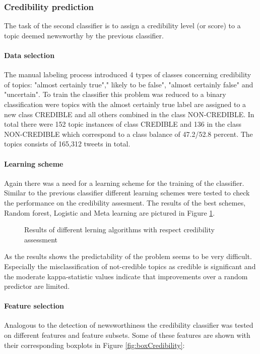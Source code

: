 \documentclass{proseminar}
\begin{document}
\subsubsection*{Credibility prediction}
The task of the second classifier is to assign a credibility level (or score) to a topic deemed newsworthy by the previous classifier.

\paragraph{Data selection}
The manual labeling process introduced 4 types of classes concerning credibility of topics:  "almost certainly true"," likely to be false",  "almost certainly false" and "uncertain". To train the classifier this problem was reduced to a binary classification were topics with the almost certainly true label are assigned to a new class CREDIBLE and all others combined in the class NON-CREDIBLE.
In total there were 152 topic instances of class CREDIBLE and 136 in the class NON-CREDIBLE which correspond to a class balance of 47.2/52.8 percent. The topics consists of  165,312 tweets in total. 


\paragraph{Learning scheme}
Again there was a need for a learning scheme for the training of the classifier. Similar to the previous classifier different learning schemes were tested to check the performance on the credibility assesment. The results of the best schemes, Random forest, Logistic and Meta learning are pictured in Figure \ref{fig:schemeCredibility}.

\begin{figure}[h]
\centering
{}
\caption{Results of different lerning algorithms with respect credibility assessment}
\label{fig:schemeCredibility}
\end{figure}

As the results shows the predictability of the problem seems to be very difficult. Especially the misclassification of not-credible topics as credible is significant and the moderate kappa-statistic values indicate that improvements over a random predictor are limited.

\paragraph{Feature selection}
Analogous to the detection of newsworthiness the credibility classifier was tested on different features and feature subsets. Some of these features are shown with their corresponding boxplots in Figure \ref{fig:boxCredibility}:
\end{document}
